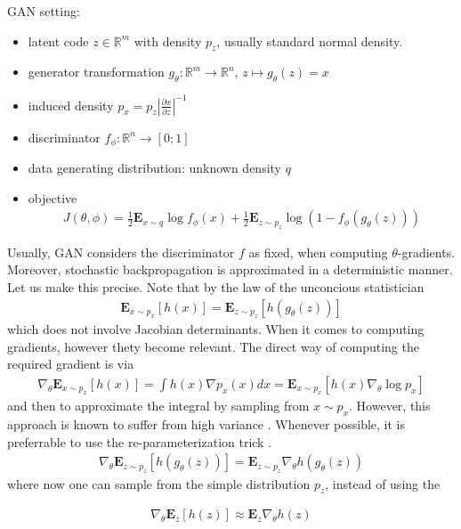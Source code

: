 \documentclass{article}
\renewcommand{\Re}{{\mathbb R}}
\newcommand{\E}{{\mathbf E}}
\begin{document}
\noindent
GAN setting: 
\begin{itemize}
\item latent code $z \in \Re^m$ with density $p_z$, usually standard normal density.
\item generator transformation $g_\theta: \Re^m \to \Re^n$, $z \mapsto g_\theta(z) = x$
\item induced density  $p_x = p_z \left| \frac{\partial x}{\partial z} \right|^{-1}$
\item discriminator $f_\phi: \Re^n \to [0;1]$
\item data generating distribution: unknown density $q$
\item objective 
\begin{align}
J(\theta, \phi) = \frac 12 \E_{x \sim q} \log f_\phi(x)  + \frac 12 \E_{z \sim p_z} \log (1-f_\phi(g_\theta(z)))
\end{align}
\end{itemize}

\noindent 
Usually, GAN considers the discriminator $f$ as fixed, when computing $\theta$-gradients. 
Moreover, stochastic backpropagation is approximated in a deterministic manner. Let us make this precise. Note that by the law of the unconcious statistician
\begin{align}
\E_{x \sim p_x} [h(x)]  = \E_{z \sim p_z} [h(g_\theta(z))]
\end{align} 
which does not involve Jacobian determinants. When it comes to computing gradients, however thety become relevant. The direct way of computing the required gradient is via
\begin{align}
\nabla_\theta \E_{x \sim p_x} [h(x)] = 
\int h(x) \nabla p_x(x) dx = 
\E_{x \sim p_x}\left[ h(x) \nabla_\theta \log p_x \right] 
\end{align}
and then to approximate the integral by sampling from $x \sim p_x$. However, this approach is known to suffer from high variance \cite{paisley2012variational,kingma2013auto}. Whenever possible, it is preferrable to use the re-parameterization trick \cite{kingma2013auto, rezende2014stochastic}.  
\begin{align}
\nabla_\theta \E_{z \sim p_z} [h(g_\theta(z))] =  \E_{z \sim p_z} \nabla_\theta h(g_\theta(z))
\end{align}
where now one can sample from the simple distribution $p_z$, instead of using the 


\begin{align}
\nabla_\theta \E_z[h(z)] \approx \E_z \nabla_\theta h(z)
\end{align}



\end{document}
